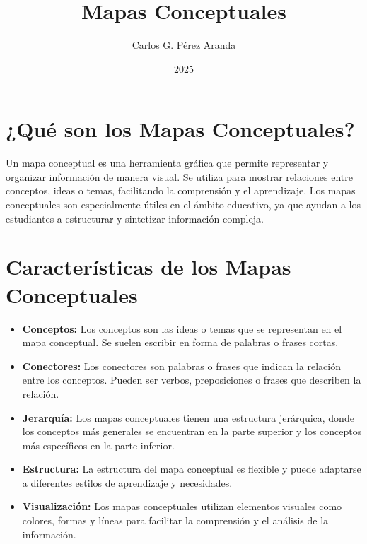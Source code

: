 \documentclass[12pt, a4paper, twoside]{article}
\title{Mapas Conceptuales}
\author{Carlos G. Pérez Aranda}
\date{2025}
\begin{document}
\maketitle

\section{¿Qué son los Mapas Conceptuales?}
Un mapa conceptual es una herramienta gráfica que permite representar y 
organizar información de manera visual. Se utiliza para mostrar 
relaciones entre conceptos, ideas o temas, facilitando la comprensión y 
el aprendizaje. Los mapas conceptuales son especialmente útiles en el 
ámbito educativo, ya que ayudan a los estudiantes a estructurar y 
sintetizar información compleja.

\section{Características de los Mapas Conceptuales}
\begin{itemize}
    \item \textbf{Conceptos:} Los conceptos son las ideas o temas que se representan en el mapa conceptual. Se suelen escribir en forma de palabras o frases cortas.
    \item \textbf{Conectores:} Los conectores son palabras o frases que indican la relación entre los conceptos. Pueden ser verbos, preposiciones o frases que describen la relación.
    \item \textbf{Jerarquía:} Los mapas conceptuales tienen una estructura jerárquica, donde los conceptos más generales se encuentran en la parte superior y los conceptos más específicos en la parte inferior.
    \item \textbf{Estructura:} La estructura del mapa conceptual es flexible y puede adaptarse a diferentes estilos de aprendizaje y necesidades.
    \item \textbf{Visualización:} Los mapas conceptuales utilizan elementos visuales como colores, formas y líneas para facilitar la comprensión y el análisis de la información.
\end{itemize}
\end{document}
